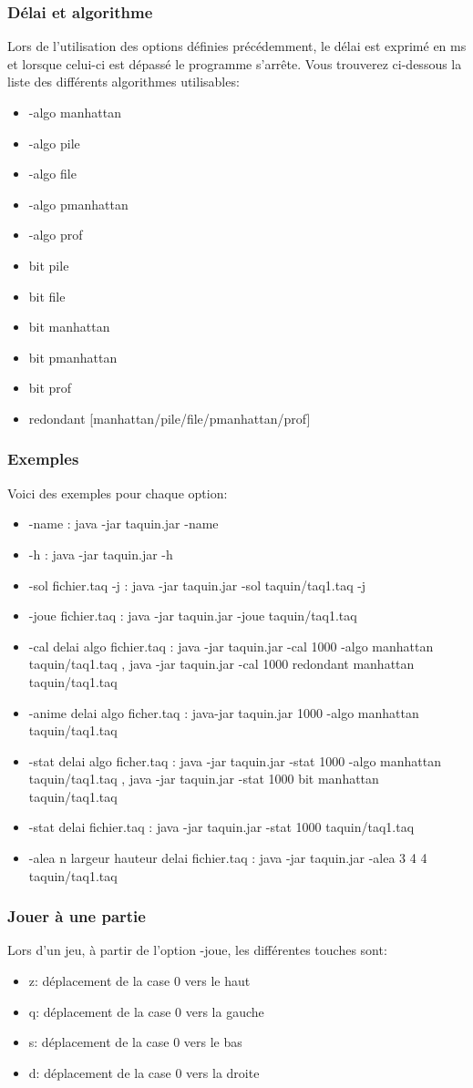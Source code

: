 \documentclass{beamer}
\begin{document}
  \begin{frame}
	\frametitle{Délai et algorithme}
	Lors de l'utilisation des options définies précédemment, le délai est exprimé en ms et lorsque celui-ci est dépassé le programme s'arrête. Vous trouverez ci-dessous la liste des différents algorithmes utilisables:
	\begin{itemize}
	\item -algo manhattan
	\item -algo pile
	\item -algo file
	\item -algo pmanhattan
	\item -algo prof
	\item bit pile
	\item bit file
	\item bit manhattan
	\item bit pmanhattan
	\item bit prof
	\item redondant [manhattan/pile/file/pmanhattan/prof]
	\end{itemize}
  \end{frame}
  \begin{frame}
   \frametitle{Exemples}
	Voici des exemples pour chaque option:
\begin{itemize}
	\item -name : java -jar taquin.jar -name
	\item -h : java -jar taquin.jar -h
	\item -sol fichier.taq -j : java -jar taquin.jar -sol taquin/taq1.taq -j
	\item -joue fichier.taq : java -jar taquin.jar -joue taquin/taq1.taq
	\item -cal delai algo fichier.taq : java -jar taquin.jar -cal 1000 -algo manhattan taquin/taq1.taq , java -jar taquin.jar -cal 1000 redondant manhattan taquin/taq1.taq 
	\item -anime delai algo ficher.taq : java-jar taquin.jar 1000 -algo manhattan taquin/taq1.taq
	\item -stat delai algo ficher.taq : java -jar taquin.jar -stat 1000 -algo manhattan taquin/taq1.taq , java -jar taquin.jar -stat 1000 bit manhattan taquin/taq1.taq
	\item -stat delai fichier.taq : java -jar taquin.jar -stat 1000 taquin/taq1.taq
	\item -alea n largeur hauteur delai fichier.taq : java -jar taquin.jar -alea 3 4 4 taquin/taq1.taq
	\end{itemize}
  \end{frame}
  \begin{frame}
   \frametitle{Jouer à une partie}
	Lors d'un jeu, à partir de l'option -joue, les différentes touches sont:
	\begin{itemize}
	\item z: déplacement de la case 0 vers le haut
	\item q: déplacement de la case 0 vers la gauche
	\item s: déplacement de la case 0 vers le bas
	\item d: déplacement de la case 0 vers la droite
	\end{itemize}
	\end{frame}
\end{document}
